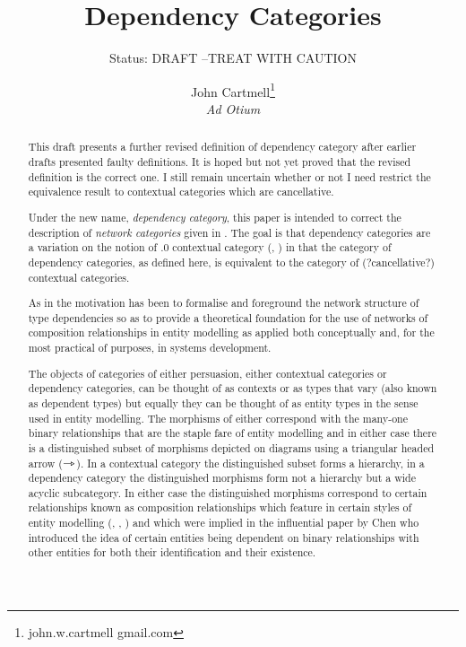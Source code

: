 \documentclass[10pt,a4paper]{scrartcl}
\title{Dependency Categories}
\author{John Cartmell\footnote{john.w.cartmell gmail.com}\\ \normalsize{\textit{Ad Otium}}}
\subtitle{Status: \normalsize{DRAFT --TREAT WITH CAUTION}}
\begin{document}
\maketitle

\begin{abstract}

This draft presents a further revised definition of dependency category after
earlier drafts presented faulty definitions.  It is hoped but not yet proved that the revised definition  is the correct one.
I still remain uncertain whether or not I need restrict the equivalence result to contextual categories which are cancellative. 

\noindent Under the new name, \textit{dependency category}, this paper is intended to correct the description of \textit{network categories} given in  
\cite{Cartmell86B}. The goal is that dependency categories are a variation on the notion of
.0 contextual category (\cite{Cartmell78}, \cite{Cartmell86}) in that  the category of dependency categories, as defined here, is equivalent to the category of (?cancellative?) contextual categories.

As in \cite{Cartmell86B} the motivation has been to formalise
and foreground the network structure of type dependencies so as to provide a theoretical foundation for the use of networks of composition relationships in entity modelling as applied both conceptually and, for the most practical of purposes, in systems development. 

The objects of  categories of either persuasion, either contextual categories or dependency categories, can be thought 
of as contexts or as types that vary (also known as dependent types) but equally they can be thought of as entity 
types in the sense used in entity modelling. The
morphisms of either correspond with the many-one binary relationships that are the staple fare of entity modelling and in either case there is a  distinguished subset of morphisms depicted on diagrams using a triangular headed arrow ($\rightarrowtriangle$). In a contextual category  the distinguished 
subset forms a hierarchy, in a dependency category the distinguished morphisms form not a hierarchy but a wide acyclic subcategory.
In either case the distinguished morphisms correspond to certain relationships known as composition relationships which feature
in certain styles of entity modelling (\cite{ECMA-149}, \cite{Munck1988}, \cite{entitymodelling}) and which were implied in the influential paper by Chen \cite{Chen1976} who introduced the idea of certain entities being dependent on binary relationships 
with other entities for both their identification and their existence.
\end{abstract}
\end{document}
